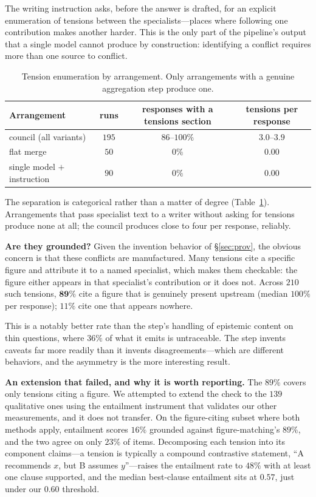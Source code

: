 \documentclass[11pt]{article}
\begin{document}
The writing instruction asks, before the answer is drafted, for an explicit
enumeration of tensions between the specialists---places where following one
contribution makes another harder. This is the only part of the pipeline's
output that a single model cannot produce by construction: identifying a
conflict requires more than one source to conflict.

\begin{table}[t]
\centering
\caption{Tension enumeration by arrangement. Only arrangements with a genuine
aggregation step produce one.}
\label{tab:tension}
\begin{tabular}{lccc}
\toprule
Arrangement & runs & responses with a tensions section & tensions per response \\
\midrule
council (all variants) & $195$ & $86$--$100\%$ & $3.0$--$3.9$ \\
flat merge & $50$ & $0\%$ & $0.00$ \\
single model $+$ instruction & $90$ & $0\%$ & $0.00$ \\
\bottomrule
\end{tabular}
\end{table}

The separation is categorical rather than a matter of degree
(Table~\ref{tab:tension}). Arrangements that pass specialist text to a writer
without asking for tensions produce none at all; the council produces close to
four per response, reliably.

\textbf{Are they grounded?} Given the invention behavior of
\S\ref{sec:prov}, the obvious concern is that these conflicts are
manufactured. Many tensions cite a specific figure and attribute it to a named
specialist, which makes them checkable: the figure either appears in that
specialist's contribution or it does not. Across $210$ such tensions,
$\mathbf{89\%}$ cite a figure that is genuinely present upstream (median
$100\%$ per response); $11\%$ cite one that appears nowhere.

This is a notably better rate than the step's handling of epistemic content on
thin questions, where $36\%$ of what it emits is untraceable. The step
invents caveats far more readily than it invents disagreements---which are
different behaviors, and the asymmetry is the more interesting result.

\textbf{An extension that failed, and why it is worth reporting.} The $89\%$
covers only tensions citing a figure. We attempted to extend the check to the
$139$ qualitative ones using the entailment instrument that validates our
other measurements, and it does not transfer. On the figure-citing subset
where both methods apply, entailment scores $16\%$ grounded against
figure-matching's $89\%$, and the two agree on only $23\%$ of items.
Decomposing each tension into its component claims---a tension is typically a
compound contrastive statement, ``A recommends $x$, but B assumes
$y$''---raises the entailment rate to $48\%$ with at least one clause
supported, and the median best-clause entailment sits at $0.57$, just under
our $0.60$ threshold.
\end{document}
